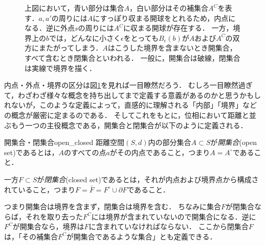 \documentclass[11pt,a4paper, dvipdfmx]{jsarticle}
\begin{document}
\begin{figure}[htbp]
 \begin{center}
 \end{center}
 \caption{上図において，青い部分は集合$A$，白い部分はその補集合$A^C$を表す．$a, a'$の周りには$A$にすっぽり収まる開球をとれるため，内点になる．逆に外点$s$の周りには$A^C$に収まる開球が存在する．
 一方，境界上の$b$では，どんなに小さく$\epsilon$をとっても$B_\epsilon(b)$が$A$および$A^C$の双方にまたがってしまう．$A$はこうした境界を含まないとき開集合，すべて含むとき閉集合といわれる．
 一般に，開集合は破線，閉集合は実線で境界を描く．}
 \label{fig:openset}
\end{figure}

内点・外点・境界の区分は図\ref{fig:openset}を見れば一目瞭然だろう．
むしろ一目瞭然過ぎて，わざわざ様々な概念を持ち出してまで定義する意義があるのかと思うかもしれないが，このような定義によって，直感的に理解される「内部」「境界」などの概念が厳密に定まるのである．
そしてこれをもとに，位相において距離と並ぶもう一つの主役概念である，開集合と閉集合が以下のように定義される．

\begin{dfn}{開集合・閉集合}{open_closed}
  距離空間$(S, d)$内の部分集合$A \subset S$が\emph{開集合}(open set)であるとは，$A$のすべての点$a$がその内点であること，つまり$A = A^\circ$であること．

  一方$F \subset S$が\emph{閉集合}(closed set)であるとは，それが内点および境界点から構成されていること，つまり$F = \bar{F} = F^\circ \cup \partial F$であること．
\end{dfn}

つまり開集合は境界を含まず，閉集合は境界を含む．
ちなみに集合$F$が閉集合ならば，それを取り去った$F^C$には境界が含まれていないので開集合になる．逆に$F^C$が開集合なら，境界は$F$に含まれていなければならない．
ここから閉集合$F$は，「その補集合$F^C$が開集合であるような集合」とも定義できる．
\end{document}
